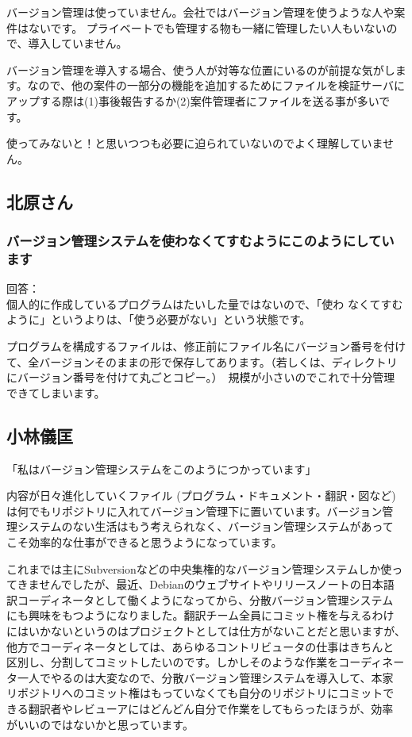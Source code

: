 \documentclass[mingoth,a4paper]{jsarticle}
\begin{document}
バージョン管理は使っていません。会社ではバージョン管理を使うような人や案件はないです。
プライベートでも管理する物も一緒に管理したい人もいないので、導入していません。

バージョン管理を導入する場合、使う人が対等な位置にいるのが前提な気がします。なので、他の案件の一部分の機能を追加するためにファイルを検証サーバにアップする際は(1)事後報告するか(2)案件管理者にファイルを送る事が多いです。

使ってみないと！と思いつつも必要に迫られていないのでよく理解していません。


\subsection{北原さん}

\subsubsection{バージョン管理システムを使わなくてすむようにこのようにしています}


回答：\\
個人的に作成しているプログラムはたいした量ではないので、「使わ
なくてすむように」というよりは、「使う必要がない」という状態です。　　

プログラムを構成するファイルは、修正前にファイル名にバージョン番号を付け
て、全バージョンそのままの形で保存してあります。（若しくは、ディレクトリ
にバージョン番号を付けて丸ごとコピー。）　規模が小さいのでこれで十分管理
できてしまいます。

\subsection{小林儀匡}

「私はバージョン管理システムをこのようにつかっています」

内容が日々進化していくファイル (プログラム・ドキュメント・翻訳・図など) 
は何でもリポジトリに入れてバージョン管理下に置いています。バージョン管
理システムのない生活はもう考えられなく、バージョン管理システムがあって
こそ効率的な仕事ができると思うようになっています。

これまでは主にSubversionなどの中央集権的なバージョン管理システムしか使っ
てきませんでしたが、最近、Debianのウェブサイトやリリースノートの日本語
訳コーディネータとして働くようになってから、分散バージョン管理システム
にも興味をもつようになりました。翻訳チーム全員にコミット権を与えるわけ
にはいかないというのはプロジェクトとしては仕方がないことだと思いますが、
他方でコーディネータとしては、あらゆるコントリビュータの仕事はきちんと
区別し、分割してコミットしたいのです。しかしそのような作業をコーディネー
タ一人でやるのは大変なので、分散バージョン管理システムを導入して、本家
リポジトリへのコミット権はもっていなくても自分のリポジトリにコミットで
きる翻訳者やレビューアにはどんどん自分で作業をしてもらったほうが、効率
がいいのではないかと思っています。
\end{document}
